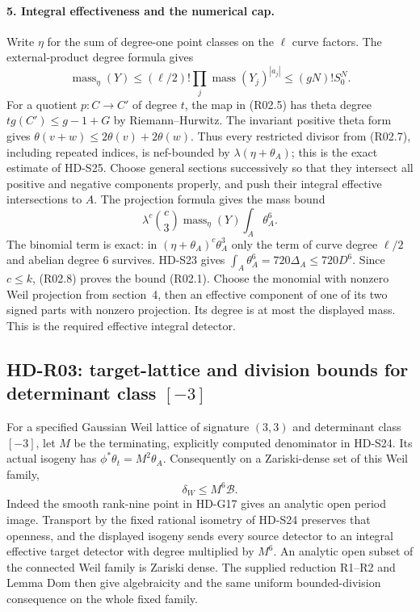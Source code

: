 \paragraph{5. Integral effectiveness and the numerical cap.}
Write $\eta$ for the sum of degree-one point classes on the
$\ell$ curve factors. The external-product degree formula gives
\[
 \operatorname{mass}_\eta(Y)
 \le (\ell/2)!\prod_j\operatorname{mass}(Y_j)^{|a_j|}
 \le(gN)!S_0^N.                                      \tag{R02.8}
\]
For a quotient $p:C\to C'$ of degree $t$, the map in (R02.5)
has theta degree $t g(C')\le g-1+G$ by Riemann--Hurwitz.
The invariant positive theta form gives
$\theta(v+w)\le2\theta(v)+2\theta(w)$.
Thus every restricted divisor from (R02.7), including repeated
indices, is nef-bounded by
$\lambda(\eta+\theta_A)$; this is the exact estimate of HD-S25.
Choose general sections successively so that they intersect all
positive and negative components properly, and push their integral
effective intersections to $A$.
The projection formula gives the mass bound
\[
 \lambda^c\binom{c}{3}\operatorname{mass}_\eta(Y)
                           \int_A\theta_A^6.
\]
The binomial term is exact: in
$(\eta+\theta_A)^c\theta_A^3$ only the term of curve degree
$\ell/2$ and abelian degree $6$ survives.
HD-S23 gives $\int_A\theta_A^6=720\Delta_A\le720D^6$.
Since $c\le k$, (R02.8) proves the bound (R02.1).
Choose the monomial with nonzero Weil projection from section~4,
then an effective component of one of its two signed parts with
nonzero projection. Its degree is at most the displayed mass.
This is the required effective integral detector.

\subsection{HD-R03: target-lattice and division bounds for determinant class $[-3]$}
For a specified Gaussian Weil lattice of signature $(3,3)$ and
determinant class $[-3]$, let $M$ be the terminating, explicitly
computed denominator in HD-S24. Its actual isogeny has
$\phi^*\theta_t=M^2\theta_A$. Consequently on a Zariski-dense
set of this Weil family,
\begin{equation}
          \delta_W\le M^6\mathcal B.                 \tag{R03.1}
\end{equation}
Indeed the smooth rank-nine point in HD-G17 gives an analytic open
period image. Transport by the fixed rational isometry of HD-S24
preserves that openness, and the displayed isogeny sends every
source detector to an integral effective target detector with
degree multiplied by $M^6$. An analytic open subset of the
connected Weil family is Zariski dense. The supplied reduction
R1--R2 and Lemma Dom then give algebraicity and the same uniform
bounded-division consequence on the whole fixed family.

